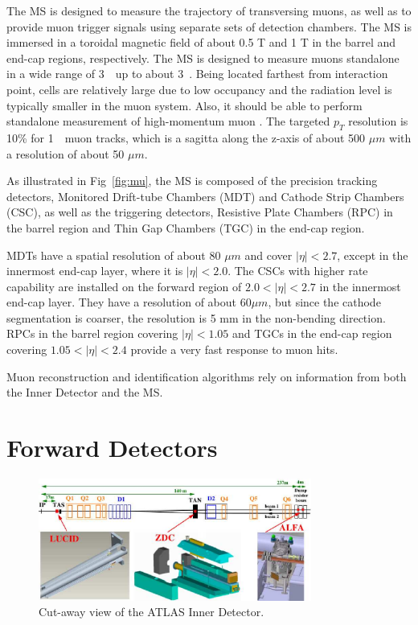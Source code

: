 \par The MS \cite{CERN-LHCC-97-022} is designed to measure the trajectory of transversing muons, as well as to provide muon trigger signals using separate sets of detection chambers. The MS is immersed in a toroidal magnetic field of about 0.5 T and 1 T in the barrel and end-cap regions, respectively. The MS is designed to measure muons standalone in a wide range of 3~\GeV~up to about 3~\TeV. Being located farthest from interaction point, cells are relatively large due to low occupancy and the radiation level is typically smaller in the muon system. Also, it should be able to perform standalone measurement of high-momentum muon \cite{muon}.
The targeted $p_T$ resolution is 10\% for 1~\TeV~muon tracks, which is a sagitta along the z-axis of about 500 $\mu m$ with a resolution of about 50 $\mu m$.

\par As illustrated in Fig~\ref{fig:mu}, the MS is composed of the precision tracking detectors, Monitored Drift-tube Chambers (MDT) and Cathode Strip Chambers (CSC), as well as the triggering detectors, Resistive Plate Chambers (RPC) in the barrel region and Thin Gap Chambers (TGC) in the end-cap region.

\par MDTs have a spatial resolution of about 80 $\mu m$ and cover $|\eta| < 2.7$, except in the innermost end-cap layer, where it is $|\eta| < 2.0$. The CSCs with higher rate capability are installed on the forward region of $2.0 < |\eta| < 2.7$ in the innermost end-cap layer. They have a resolution of about 60$\mu m$, but since the cathode segmentation is coarser, the resolution is 5 mm in the non-bending direction. RPCs in the barrel region covering $|\eta| < 1.05$ and TGCs in the end-cap region covering $1.05 < |\eta| < 2.4$ provide a very fast response to muon hits.

\par Muon reconstruction and identification algorithms rely on information from both the Inner Detector and the MS.

\section{Forward Detectors}
\label{sec:for}
\begin{figure}[htbp]
    \centering
    \includegraphics[width=0.8\textwidth]{chapters/c4/figures/forward}
    \caption{Cut-away view of the ATLAS Inner Detector.}
    \label{fig:forward}
\end{figure}

